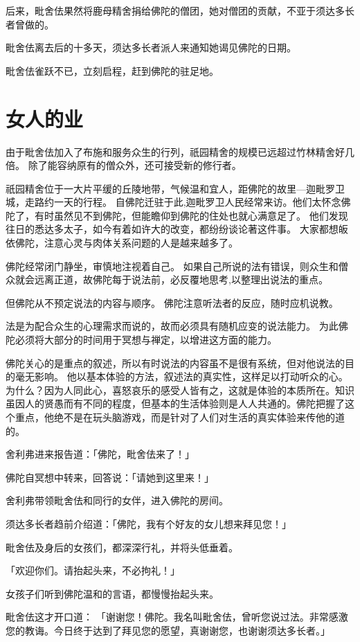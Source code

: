 \documentclass[twoside,openany]{book}
\begin{document}
后来，毗舍佉果然将鹿母精舍捐给佛陀的僧团，她对僧团的贡献，不亚于须达多长者曾做的。

毗舍佉离去后的十多天，须达多长者派人来通知她谒见佛陀的日期。

毗舍佉雀跃不已，立刻启程，赶到佛陀的驻足地。

\section{女人的业}\label{sec7.2}

由于毗舍佉加入了布施和服务众生的行列，祇园精舍的规模已远超过竹林精舍好几倍。
除了能容纳原有的僧众外，还可接受新的修行者。

祇园精舍位于一大片平缓的丘陵地带，气候温和宜人，距佛陀的故里---迦毗罗卫城，走路约一天的行程。
自佛陀迁驻于此,迦毗罗卫人民经常来访。他们太怀念佛陀了，有时虽然见不到佛陀，但能瞻仰到佛陀的住处也就心满意足了。
他们发现往日的悉达多太子，如今有着如许大的改变，都纷纷谈论著这件事。
大家都想皈依佛陀，注意心灵与肉体关系问题的人是越来越多了。

佛陀经常闭门静坐，审慎地注视着自己。
如果自己所说的法有错误，则众生和僧众就会远离正道，故佛陀每于说法前，必反覆地思考,以整理出说法的重点。

但佛陀从不预定说法的内容与顺序。
佛陀注意听法者的反应，随时应机说教。

法是为配合众生的心理需求而说的，故而必须具有随机应变的说法能力。
为此佛陀必须将大部分的时间用于冥想与禅定，以增进这方面的能力。

佛陀关心的是重点的叙述，所以有时说法的内容虽不是很有系统，但对他说法的目的毫无影响。
他以基本体验的方法，叙述法的真实性，这样足以打动听众的心。
为什么？因为人同此心，喜怒哀乐的感受人皆有之，这就是体验的本质所在。知识虽因人的贤愚而有不同的程度，但基本的生活体验则是人人共通的。佛陀把握了这个重点，他绝不是在玩头脑游戏，而是针对了人们对生活的真实体验来传他的道的。

舍利弗进来报告道：「佛陀，毗舍佉来了！」

佛陀自冥想中转来，回答说：「请她到这里来！」

舍利弗带领毗舍佉和同行的女伴，进入佛陀的房间。

须达多长者趋前介绍道：「佛陀，我有个好友的女儿想来拜见您！」

毗舍佉及身后的女孩们，都深深行礼，并将头低垂着。

「欢迎你们。请抬起头来，不必拘礼！」

女孩子们听到佛陀温和的言语，都慢慢抬起头来。

毗舍佉这才开口道：
「谢谢您！佛陀。我名叫毗舍佉，曾听您说过法。非常感激您的教诲。今日终于达到了拜见您的愿望，真谢谢您，也谢谢须达多长者。」
\end{document}
